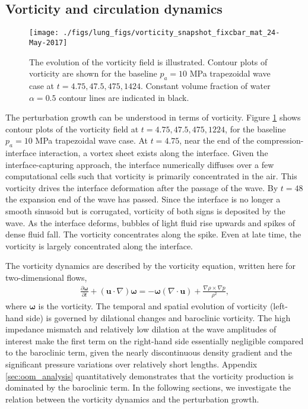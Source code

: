 \documentclass{jfm}%
\begin{document}
\subsection{Vorticity and circulation dynamics}
\begin{figure}
  \centering
  \texttt{[image: ./figs/lung\_figs/vorticity\_snapshot\_fixcbar\_mat\_24-May-2017]}
  \caption[The evolution of the vorticity] {The evolution of the
    vorticity field is illustrated. Contour plots of vorticity are
    shown for the baseline $p_a = 10$ MPa trapezoidal wave case at
    $t = 4.75, 47.5, 475, 1424$. Constant volume fraction of water
    $\alpha = 0.5$ contour lines are indicated in black.}
  \label{fig:vorticity_snapshots}
\end{figure}
% 
The perturbation growth can be understood in terms of
vorticity. Figure \ref{fig:vorticity_snapshots} shows contour plots of
the vorticity field at $t = 4.75, 47.5, 475, 1224$, for the baseline
$p_a = 10$ MPa trapezoidal wave case. At $t = 4.75$, near the end of the
compression-interface interaction, a vortex sheet exists along the
interface. Given the interface-capturing approach, the interface
numerically diffuses over a few computational cells such that
vorticity is primarily concentrated in the air. This vorticity drives
the interface deformation after the passage of the wave. By $t = 48$ the
expansion end of the wave has passed. Since the interface is no longer
a smooth sinusoid but is corrugated, vorticity of both signs is
deposited by the wave. As the interface deforms, bubbles of light
fluid rise upwards and spikes of dense fluid fall. The vorticity
concentrates along the spike. Even at late time, the vorticity is
largely concentrated along the interface.

The vorticity dynamics are described by the vorticity equation,
written here for two-dimensional flows,
\begin{align} \label{eq:vorticity_euler}
  \frac{\partial \boldsymbol{\omega}}{\partial t}+\left(\boldsymbol{u}\cdot\nabla\right)\boldsymbol{\omega} =%
  - \boldsymbol{\omega}\left(\nabla\cdot\boldsymbol{u}\right) + \frac{\nabla\rho\times\nabla p}{\rho^2},%
\end{align}
where $\boldsymbol{\omega}$ is the vorticity. The temporal and spatial
evolution of vorticity (left-hand side) is governed by dilational
changes and baroclinic vorticity. The high impedance mismatch and
relatively low dilation at the wave amplitudes of interest make the
first term on the right-hand side essentially negligible compared to
the baroclinic term, given the nearly discontinuous density gradient
and the significant pressure variations over relatively short
lengths. Appendix \ref{sec:oom_analysis} quantitatively demonstrates
that the vorticity production is dominated by the baroclinic term. In
the following sections, we investigate the relation between the
vorticity dynamics and the perturbation growth.
\end{document}
